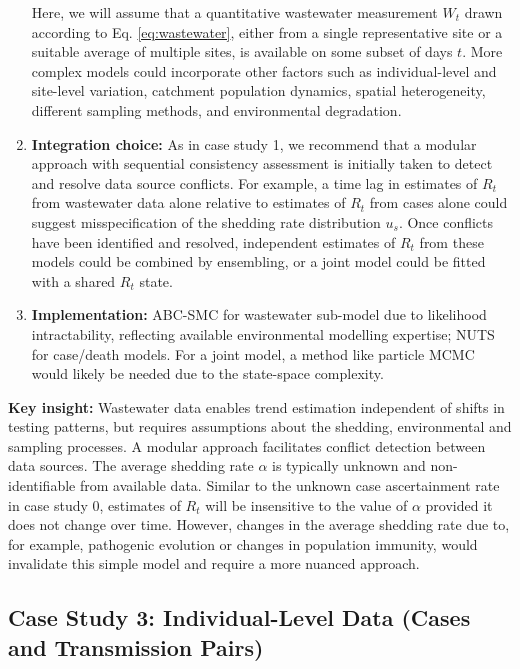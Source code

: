 \documentclass{article}
\begin{document}
\begin{enumerate}
    Here, we will assume that a quantitative wastewater measurement $W_t$ drawn according to Eq. \eqref{eq:wastewater}, either from a single representative site or a suitable average of multiple sites, is available on some subset of days $t$. 
    More complex models could incorporate other factors such as individual-level and site-level variation, catchment population dynamics, spatial heterogeneity, different sampling methods, and environmental degradation.
    \item \textbf{Integration choice:} As in case study 1, we recommend that a modular approach with sequential consistency assessment is initially taken to detect and resolve data source conflicts. For example, a time lag in estimates of $R_t$ from wastewater data alone relative to estimates of $R_t$ from cases alone could suggest misspecification of the shedding rate distribution $u_s$. Once conflicts have been identified and resolved, independent estimates of $R_t$ from these models could be combined by ensembling, or a joint model could be fitted with a shared $R_t$ state. 
    \item \textbf{Implementation:} ABC-SMC for wastewater sub-model due to likelihood intractability, reflecting available environmental modelling expertise; NUTS for case/death models. For a joint model, a method like particle MCMC would likely be needed due to the state-space complexity.
\end{enumerate}

\textbf{Key insight:} Wastewater data enables trend estimation independent of shifts in testing patterns, but requires assumptions about the shedding, environmental and sampling processes. A modular approach facilitates conflict detection between data sources. The average shedding rate $\alpha$ is typically unknown and non-identifiable from available data. Similar to the unknown case ascertainment rate in case study 0, estimates of $R_t$ will be insensitive to the value of $\alpha$ provided it does not change over time. However, changes in the average shedding rate due to, for example, pathogenic evolution or changes in population immunity, would invalidate this simple model and require a more nuanced approach.  



\subsection{Case Study 3: Individual-Level Data (Cases and Transmission Pairs)}
\end{document}
